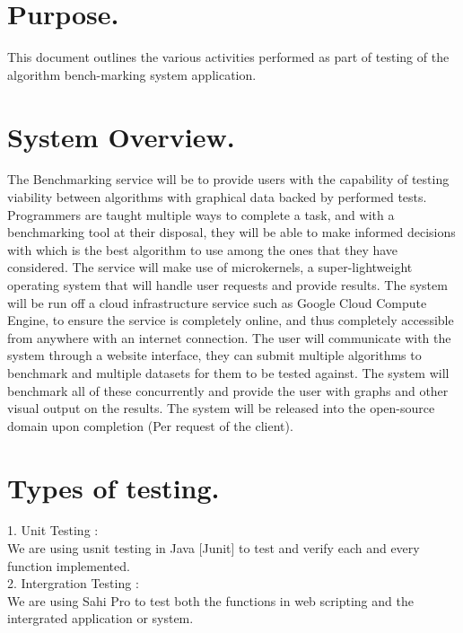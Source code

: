 \documentclass[runningheads,a4paper]{article}
\begin{document}
\section{Purpose.}
\raggedright{
This document outlines the various activities performed as part of testing of the algorithm bench-marking system application.
}

\section{System Overview.}
\raggedright{
The Benchmarking service will be to provide users with the capability of testing viability between algorithms
with graphical data backed by performed tests. Programmers are taught multiple ways to complete a task,
and with a benchmarking tool at their disposal, they will be able to make informed decisions with which is the
best algorithm to use among the ones that they have considered.
The service will make use of microkernels, a super-lightweight operating system that will handle user requests
and provide results. The system will be run off a cloud infrastructure service such as Google Cloud Compute
Engine, to ensure the service is completely online, and thus completely accessible from anywhere with an
internet connection.
The user will communicate with the system through a website interface, they can submit multiple algorithms
to benchmark and multiple datasets for them to be tested against. The system will benchmark all of these
concurrently and provide the user with graphs and other visual output on the results.
The system will be released into the open-source domain upon completion (Per request of the client).
\\
}
\section{Types of testing.}
\raggedright{
1. Unit Testing : \\
We are using usnit testing in Java [Junit] to test and verify each and every function implemented.\\
2. Intergration Testing : \\
We are using Sahi Pro to test both the functions in web scripting and the intergrated application or system.

}
\end{document}
